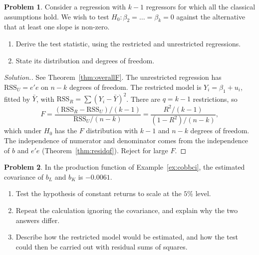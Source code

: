 \documentclass[11pt,a4paper]{article}
\numberwithin{equation}{section}
\theoremstyle{definition}
\newtheorem{problemx}{Problem}[subsection]
\newenvironment{problem}{\begin{problemx}}{\end{problemx}}
\newenvironment{solution}
  {\renewcommand{\qedsymbol}{}\begin{proof}[\textit{Solution}.]}
  {\end{proof}}
\begin{document}
\begin{problem}
Consider a regression with $k - 1$ regressors for which all the classical assumptions hold. We wish to test $H_0\colon \beta_2 = \dots = \beta_k = 0$ against the
alternative that at least one slope is non-zero.
\begin{enumerate}[label=(\roman*)]
\item Derive the test statistic, using the restricted and unrestricted regressions.
\item State its distribution and degrees of freedom.
\end{enumerate}
\end{problem}

\begin{solution}
See Theorem~\ref{thm:overallF}. The unrestricted regression has $\text{RSS}_U = e'e$ on $n - k$ degrees of freedom. The restricted model is
$Y_i = \beta_1 + u_i$, fitted by $\bar Y$, with $\text{RSS}_R = \sum (Y_i - \bar Y)^2$. There are $q = k - 1$ restrictions, so
\[
F = \frac{(\text{RSS}_R - \text{RSS}_U)/(k - 1)}{\text{RSS}_U/(n - k)} = \frac{R^2/(k - 1)}{(1 - R^2)/(n - k)},
\]
which under $H_0$ has the $F$ distribution with $k - 1$ and $n - k$ degrees of freedom. The independence of numerator and denominator comes from the
independence of $b$ and $e'e$ (Theorem~\ref{thm:residqf}). Reject for large $F$.
\end{solution}

\begin{problem}
In the production function of Example~\ref{ex:cobbci}, the estimated covariance of $b_L$ and $b_K$ is $-0.0061$.
\begin{enumerate}[label=(\alph*)]
\item Test the hypothesis of constant returns to scale at the $5\%$ level.
\item Repeat the calculation ignoring the covariance, and explain why the two answers differ.
\item Describe how the restricted model would be estimated, and how the test could then be carried out with residual sums of squares.
\end{enumerate}
\end{problem}
\end{document}
